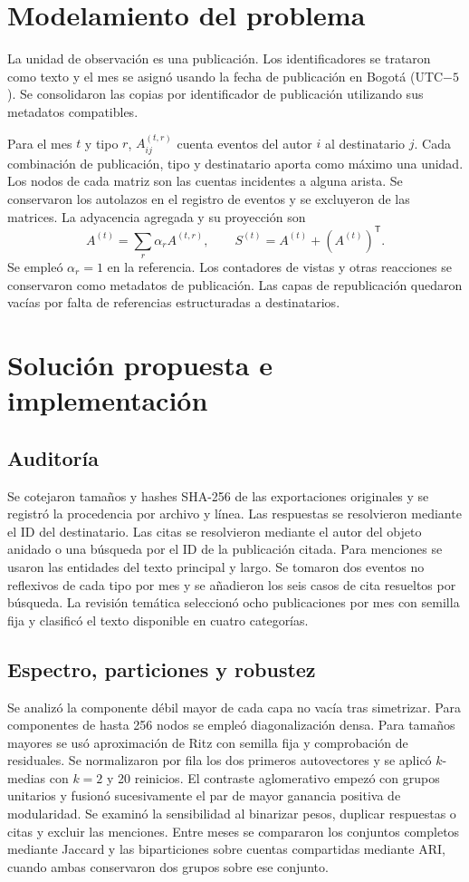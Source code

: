 \documentclass[journal]{IEEEtran}
\begin{document}
\section{Modelamiento del problema}
La unidad de observación es una publicación. Los identificadores se trataron como texto y el mes se asignó usando la fecha de publicación en Bogotá (UTC$-5$). Se consolidaron las copias por identificador de publicación utilizando sus metadatos compatibles.

Para el mes $t$ y tipo $r$, $A^{(t,r)}_{ij}$ cuenta eventos del autor $i$ al destinatario $j$. Cada combinación de publicación, tipo y destinatario aporta como máximo una unidad. Los nodos de cada matriz son las cuentas incidentes a alguna arista. Se conservaron los autolazos en el registro de eventos y se excluyeron de las matrices. La adyacencia agregada y su proyección son
\begin{equation}
A^{(t)}=\sum_r\alpha_r A^{(t,r)},\qquad S^{(t)}=A^{(t)}+(A^{(t)})^{\mathsf T}.
\end{equation}
Se empleó $\alpha_r=1$ en la referencia. Los contadores de vistas y otras reacciones se conservaron como metadatos de publicación. Las capas de republicación quedaron vacías por falta de referencias estructuradas a destinatarios.

\section{Solución propuesta e implementación}
\subsection{Auditoría}
Se cotejaron tamaños y hashes SHA-256 de las exportaciones originales y se registró la procedencia por archivo y línea. Las respuestas se resolvieron mediante el ID del destinatario. Las citas se resolvieron mediante el autor del objeto anidado o una búsqueda por el ID de la publicación citada. Para menciones se usaron las entidades del texto principal y largo. Se tomaron dos eventos no reflexivos de cada tipo por mes y se añadieron los seis casos de cita resueltos por búsqueda. La revisión temática seleccionó ocho publicaciones por mes con semilla fija y clasificó el texto disponible en cuatro categorías.

\subsection{Espectro, particiones y robustez}
Se analizó la componente débil mayor de cada capa no vacía tras simetrizar. Para componentes de hasta 256 nodos se empleó diagonalización densa. Para tamaños mayores se usó aproximación de Ritz con semilla fija y comprobación de residuales. Se normalizaron por fila los dos primeros autovectores y se aplicó $k$-medias con $k=2$ y 20 reinicios. El contraste aglomerativo empezó con grupos unitarios y fusionó sucesivamente el par de mayor ganancia positiva de modularidad. Se examinó la sensibilidad al binarizar pesos, duplicar respuestas o citas y excluir las menciones. Entre meses se compararon los conjuntos completos mediante Jaccard y las biparticiones sobre cuentas compartidas mediante ARI, cuando ambas conservaron dos grupos sobre ese conjunto.
\end{document}
